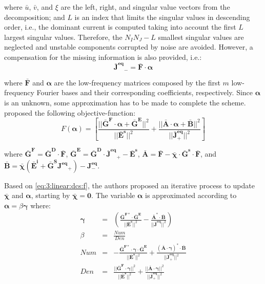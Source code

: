 			\noindent where $\bar{u}$, $\bar{v}$, and $\xi$ are the left, right, and singular value vectors from the decomposition; and $L$ is an index that limits the singular values in descending order, i.e., the dominant current is computed taking into account the first $L$ largest singular values. Therefore, the $N_IN_J - L$ smallest singular values are neglected and unstable components corrupted by noise are avoided. However, a compensation for the missing information is also provided, i.e.:
			\begin{equation}
				\mathbf{\bar{J}^{eq}}_- = \mathbf{\bar{F}}\cdot\boldsymbol{\alpha} \label{eq:3:linear:dcs:j-}
			\end{equation}
		
			\noindent where $\mathbf{\bar{F}}$ and $\boldsymbol{\alpha}$ are the low-frequency matrices composed by the first $m$ low-frequency  Fourier bases and their corresponding coefficients, respectively. Since $\boldsymbol{\alpha}$ is an unknown, some approximation has to be made to complete the scheme. \cite{wei2019deep} proposed the following objective-function:
			\begin{equation}
				F(\boldsymbol{\alpha}) = \left[ \frac{||\mathbf{\bar{G}^F}\cdot\boldsymbol{\alpha}+\mathbf{\bar{G}^E}||^2}{||\mathbf{\bar{E}^s}||^2}+\frac{||\mathbf{\bar{A}}\cdot\boldsymbol{\alpha}+\mathbf{\bar{B}}||^2    }{||\mathbf{\bar{J}^{eq}_+}||^2}\right] \label{eq:3:linear:dcs:f}
			\end{equation}
		
			\noindent where $\mathbf{\bar{G}^F} = \mathbf{\bar{G}^D}\cdot\mathbf{\bar{F}}$, $\mathbf{\bar{G}^E} = \mathbf{\bar{G}^D}\cdot\mathbf{\bar{J}^{eq}}_+ - \mathbf{\bar{E}^s}$, $\mathbf{\bar{A}} = \mathbf{\bar{F}} -\boldsymbol{\bar{\chi}}\cdot\mathbf{\bar{G}^s}\cdot\mathbf{\bar{F}}$, and $\mathbf{\bar{B}} = \boldsymbol{\bar{\chi}}(\mathbf{\bar{E}^i}+\mathbf{\bar{G}^S}\mathbf{J^{eq}}_+)-\mathbf{J^{eq}_-}$.
			
			Based on \eqref{eq:3:linear:dcs:f}, the authors proposed an iterative process to update $\boldsymbol{\bar{\chi}}$ and $\boldsymbol{\alpha}$, starting by $\boldsymbol{\bar{\chi}}=\mathbf{0}$. The variable $\boldsymbol{\alpha}$ is approximated according to $\boldsymbol{\alpha} = \beta\boldsymbol{\gamma}$ where:
			\begin{eqnarray}
				\boldsymbol{\gamma} &=& \left( \frac{\mathbf{\bar{G}^{F*}}\cdot\mathbf{\bar{G}^E}}{||\mathbf{\bar{E}^s}||^2}-\frac{\mathbf{\bar{A}^{*}}\cdot\mathbf{\bar{B}}}{||\mathbf{\bar{J}^{eq}}||^2}\right) \label{eq:3:linear:dcs:rho} \\
				\beta &=& \frac{Num}{Den} \\
				Num &=& -\frac{\mathbf{\bar{G}^{F*}}\cdot\boldsymbol{\gamma}\cdot\mathbf{\bar{G}^E}}{||\mathbf{\bar{E}^s}||^2} + \frac{(\mathbf{\bar{A}}\cdot\boldsymbol{\gamma})^{*}\cdot\mathbf{\bar{B}}}{||\mathbf{\bar{J}^{eq}_+}||^2} \\
				Den &=& \frac{||\mathbf{\bar{G}^{F}}\cdot\boldsymbol{\gamma}||^2}{||\mathbf{\bar{E}^s}||^2} + \frac{||\mathbf{\bar{A}}\cdot\boldsymbol{\gamma}||^2}{||\mathbf{\bar{J}^{eq}_+}||^2}
			\end{eqnarray}
		
